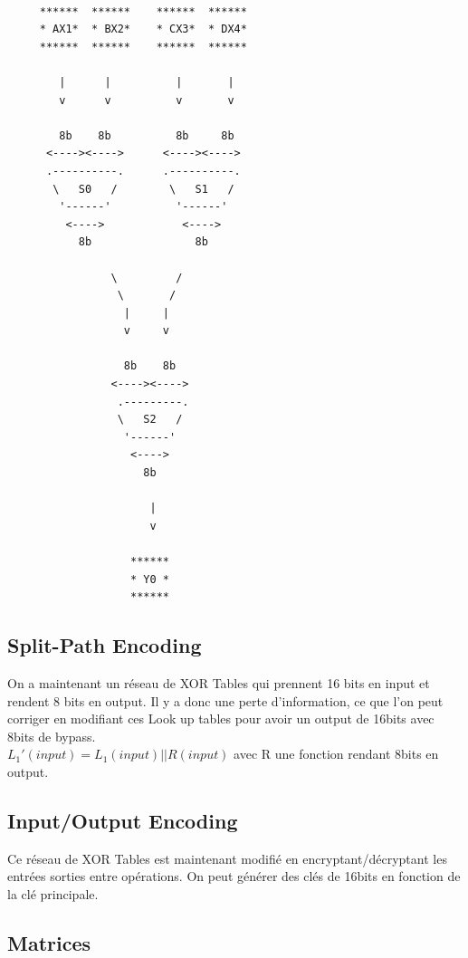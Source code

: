 \documentclass[a4paper,12pt]{article}
\begin{document}
\begin{Verbatim}[samepage=true]

     ******  ******    ******  ******
     * AX1*  * BX2*    * CX3*  * DX4*
     ******  ******    ******  ******

        |      |          |       |
        v      v          v       v

        8b    8b          8b     8b
      <----><---->      <----><---->
      .----------.      .----------.
       \   S0   /        \   S1   /
        '------'          '------'
         <---->            <---->
           8b                8b

                \         /
                 \       /
                  |     |
                  v     v

                  8b    8b
                <----><---->
                 .---------.
                 \   S2   /
                  '------'
                   <---->
                     8b

                      |
                      v

                   ******
                   * Y0 *
                   ******

\end{Verbatim}

\subsection{Split-Path Encoding}

On a maintenant un réseau de XOR Tables qui prennent 16 bits en input et rendent 8 bits en output. Il y a donc une perte d'information, ce que l'on peut corriger en modifiant ces Look up tables pour avoir un output de 16bits avec 8bits de bypass.\\
$L_1'(input) = L_1(input)||R(input)$ avec R une fonction rendant 8bits en output.
 
\subsection{Input/Output Encoding}

Ce réseau de XOR Tables est maintenant modifié en encryptant/décryptant les entrées sorties entre opérations. On peut générer des clés de 16bits en fonction de la clé principale.

\subsection{Matrices}
\end{document}
